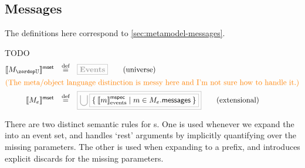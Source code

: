 \subsection{Messages}\label{ssec:semantics-tockcsp-messages}

The definitions here correspond to \cref{sec:metamodel-messages}.

\begin{defn}[\mmessageset]

TODO
%
\begin{align*}
	\msgsetsema{\aumsgset}
\quad\defeq\quad&
	\tlang{\events}
\tag{universe}
\\
\intertext{\todo{The meta/object language distinction is messy here
and I'm not sure how to handle it.}}
	\msgsetsema{\anemsgset}
\quad\defeq\quad&
\tlang{
	\bigcup
\olang{
	\Set{
		\emspecsema{\amspec} | \amspec \in \field{\anemsgset}{messages}
	}
}
}
\tag{extensional}
\end{align*}
\end{defn}

There are two distinct semantic rules for \mmessagespec s.  One is used whenever
we expand the \mmessagespec{} into an event set, and handles `rest' arguments
by implicitly quantifying over the missing parameters.  The other is used when
expanding to a prefix, and introduces explicit discards for the missing
parameters.  

